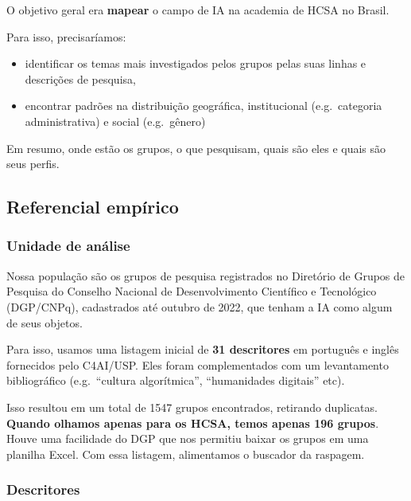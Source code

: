 \documentclass[
  brazilian,
  letterpaper,
  DIV=11,
  numbers=noendperiod]{scrartcl}
\providecommand{\tightlist}{%
  \setlength{\itemsep}{0pt}\setlength{\parskip}{0pt}}
\begin{document}
O objetivo geral era \textbf{mapear} o campo de IA na academia de HCSA
no Brasil.

Para isso, precisaríamos:

\begin{itemize}
\tightlist
\item
  identificar os temas mais investigados pelos grupos pelas suas linhas
  e descrições de pesquisa,
\item
  encontrar padrões na distribuição geográfica, institucional
  (e.g.~categoria administrativa) e social (e.g.~gênero)
\end{itemize}

Em resumo, onde estão os grupos, o que pesquisam, quais são eles e quais
são seus perfis.

\subsection{Referencial empírico}\label{referencial-empuxedrico}

\subsubsection{Unidade de análise}

Nossa população são os grupos de pesquisa registrados no Diretório de
Grupos de Pesquisa do Conselho Nacional de Desenvolvimento Científico e
Tecnológico (DGP/CNPq), cadastrados até outubro de 2022, que tenham a IA
como algum de seus objetos.

Para isso, usamos uma listagem inicial de \textbf{31 descritores} em
português e inglês fornecidos pelo C4AI/USP. Eles foram complementados
com um levantamento bibliográfico (e.g.~``cultura algorítmica'',
``humanidades digitais'' etc).

Isso resultou em um total de 1547 grupos encontrados, retirando
duplicatas. \textbf{Quando olhamos apenas para os HCSA, temos apenas 196
grupos}. Houve uma facilidade do DGP que nos permitiu baixar os grupos
em uma planilha Excel. Com essa listagem, alimentamos o buscador da
raspagem.

\subsubsection{Descritores}
\end{document}

